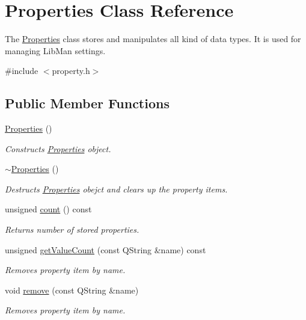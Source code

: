 \hypertarget{classProperties}{\section{Properties Class Reference}
\label{classProperties}
}


The \hyperlink{classProperties}{Properties} class stores and manipulates all kind of data types. It is used for managing Lib\-Man settings.  




{\ttfamily \#include $<$property.\-h$>$}

\subsection*{Public Member Functions}
\begin{DoxyCompactItemize}
\item 
\hyperlink{classProperties_a7c001f15168b6ec386377dc91e288033}{Properties} ()
\begin{DoxyCompactList}\small\item\em Constructs \hyperlink{classProperties}{Properties} object. \end{DoxyCompactList}\item 
\hyperlink{classProperties_a9a4367c64d90a962fc260128587670dd}{$\sim$\-Properties} ()
\begin{DoxyCompactList}\small\item\em Destructs \hyperlink{classProperties}{Properties} obejct and clears up the property items. \end{DoxyCompactList}\item 
unsigned \hyperlink{classProperties_af65e2e755382f74208fc9d3411eb7d93}{count} () const 
\begin{DoxyCompactList}\small\item\em Returns number of stored properties. \end{DoxyCompactList}\item 
unsigned \hyperlink{classProperties_a02eae31d56c3ce060acf269808c1aae4}{get\-Value\-Count} (const Q\-String \&name) const 
\begin{DoxyCompactList}\small\item\em Removes property item by name. \end{DoxyCompactList}\item 
void \hyperlink{classProperties_a648567d171b2bac9cdfa8de6fe53a865}{remove} (const Q\-String \&name)
\begin{DoxyCompactList}\small\item\em Removes property item by name. \end{DoxyCompactList}\item 

\end{DoxyCompactItemize}

